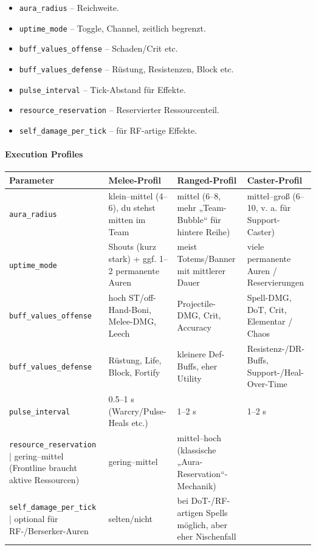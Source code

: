 \begin{itemize}
	\item \texttt{aura\_radius} – Reichweite.
	\item \texttt{uptime\_mode} – Toggle, Channel, zeitlich begrenzt.
	\item \texttt{buff\_values\_offense} – Schaden/Crit etc.
	\item \texttt{buff\_values\_defense} – Rüstung, Resistenzen, Block etc.
	\item \texttt{pulse\_interval} – Tick-Abstand für Effekte.
	\item \texttt{resource\_reservation} – Reservierter Ressourcenteil.
	\item \texttt{self\_damage\_per\_tick} – für RF-artige Effekte.
\end{itemize}

\paragraph{Execution Profiles}{}
\scriptsize %
\begin{tabular}{p{3cm} | p{4cm} | p{4cm} | p{4cm}}
	Parameter              & Melee-Profil                                           & Ranged-Profil                                               & Caster-Profil                                                  \\
	\hline
	\texttt{aura\_radius}          & klein–mittel (4–6), du stehst mitten im Team          & mittel (6–8, mehr „Team-Bubble“ für hintere Reihe)         & mittel–groß (6–10, v. a. für Support-Caster)                   \\
	\texttt{uptime\_mode}          & Shouts (kurz stark) + ggf. 1–2 permanente Auren       & meist Totems/Banner mit mittlerer Dauer                    & viele permanente Auren / Reservierungen                        \\
	\texttt{buff\_values\_offense}  & hoch ST/off-Hand-Boni, Melee-DMG, Leech               & Projectile-DMG, Crit, Accuracy                             & Spell-DMG, DoT, Crit, Elementar / Chaos                        \\
	\texttt{buff\_values\_defense}  & Rüstung, Life, Block, Fortify                         & kleinere Def-Buffs, eher Utility                           & Resistenz-/DR-Buffs, Support-/Heal-Over-Time                   \\
	\texttt{pulse\_interval}       & 0.5–1 s (Warcry/Pulse-Heals etc.)                     & 1–2 s                                                      & 1–2 s                                                          \\
	\texttt{resource\_reservation} | gering–mittel (Frontline braucht aktive Ressourcen)   & gering–mittel                                              & mittel–hoch (klassische „Aura-Reservation“-Mechanik)          \\
	\texttt{self\_damage\_per\_tick} | optional für RF-/Berserker-Auren                      & selten/nicht                                               & bei DoT-/RF-artigen Spells möglich, aber eher Nischenfall      \\
	\hline
\end{tabular}
\normalsize
